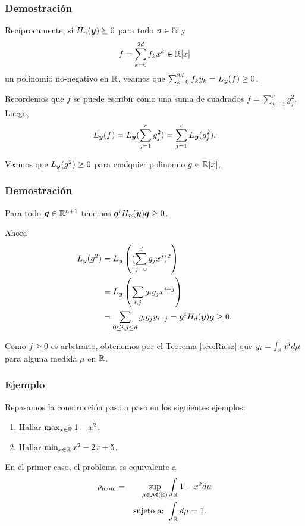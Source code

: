 \documentclass[aspectratio=169,12pt,spanish]{beamer}
\begin{document}

\begin{frame}

\frametitle{Demostración}

Recíprocamente, si $H_n(\bm{y}) \succeq 0$ para todo $n \in \mathbb{N}$ y
$$f = \sum_{k=0}^{2d} f_k x^k \in \mathbb{R}[x]$$ 
 un polinomio no-negativo en $\mathbb{R}$, veamos que $\sum_{k=0}^{2d} f_k y_k = L_{\bm{y}}(f) \ge 0$.

Recordemos que $f$ se puede escribir como una suma de cuadrados $f = \sum_{j = 1}^r g_j^2$. Luego,
$$
L_{\bm{y}}(f) = L_{\bm{y}}(\sum_{j=1}^r g_j^2) = \sum_{j=1}^r L_{\bm{y}}(g_j^2).
$$

Veamos que $L_{\bm{y}}(g^2) \ge 0$ para cualquier polinomio $g \in \mathbb{R}[x]$.
\end{frame}


\begin{frame}

\frametitle{Demostración}

Para todo $\bm{q} \in \mathbb{R}^{n+1}$ tenemos $\bm{q}^t H_n(\bm{y}) \bm{q} \ge 0$.

Ahora 
\begin{align*}
L_{\bm{y}}(g^2) &= L_{\bm{y}}\left((\sum_{j=0}^d g_j x^j)^2\right) \\
&= L_{\bm{y}}\left(\sum_{i,j} g_i g_j x^{i+j}\right) \\
&= \sum_{0 \le i,j \le d} g_i g_j y_{i+j} = \bm{g}^t H_d(\bm{y}) \bm{g} \ge 0.
\end{align*}

Como $f \ge 0$ es arbitrario, obtenemos por el Teorema \ref{teo:Riesz} que $y_i = \int_{\mathbb{R}} x^i d\mu$ para alguna medida $\mu$ en $\mathbb{R}$.


\end{frame}


\begin{frame}

\frametitle{Ejemplo}

Repasamos la construcción paso a paso en los siguientes ejemplos:

\begin{enumerate}
\item Hallar $\max_{x \in \mathbb{R}} 1 - x^2$.
\item Hallar $\min_{x \in \mathbb{R}} x^2 - 2x + 5$.
\end{enumerate}

En el primer caso, el problema es equivalente a 
\begin{alignat*}{2}
  \rho_{\text{mom}} = & & \sup_{\mu \in \mathcal{M}(\mathbb{R})} & \int_{\mathbb{R}} 1 - x^2 d\mu   \\
   & & \text{sujeto a: } & \int_{\mathbb{R}} d\mu = 1.
\end{alignat*}

\end{frame}
\end{document}
